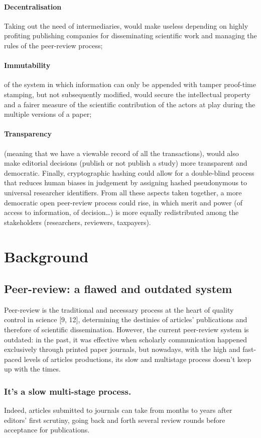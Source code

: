 \documentclass[runningheads]{llncs}
\begin{document}
\paragraph{Decentralisation}Taking out the need of intermediaries, would make useless depending on highly profiting publishing companies for disseminating scientific work and managing the rules of the peer-review process;
\paragraph{Immutability} of the system in which information can only be appended with tamper proof-time stamping,  but not subsequently modified, would secure the intellectual property and a fairer measure of the scientific contribution of the actors at play during the multiple versions of a paper;
\paragraph{Transparency} (meaning that we have a viewable record of all the transactions), would also make editorial decisions (publish or not publish a study) more transparent and democratic. Finally, cryptographic hashing could allow for a double-blind process that reduces human biases in judgement by assigning hashed pseudonymous to universal researcher identifiers. From all these aspects taken together, a more democratic open peer-review  process could rise, in which merit and power (of access to information, of decision…) is more equally redistributed among the stakeholders (researchers, reviewers, taxpayers).

\section{Background}
\subsection{Peer-review: a flawed and outdated system}
Peer-review is the traditional and necessary process at the heart of quality control in science [9, 12], determining the destinies of articles’ publications and therefore of scientific dissemination. However, the current peer-review system is outdated: in the past, it was effective when scholarly communication happened exclusively through printed paper journals, but nowadays, with the high and fast-paced levels of articles productions, its slow and multistage process doesn’t keep up with the times.
\subsubsection{It's a slow multi-stage process.} Indeed, articles submitted to journals can take from months to years after editors’ first scrutiny, going back and forth several review rounds before acceptance for publications.
\end{document}
